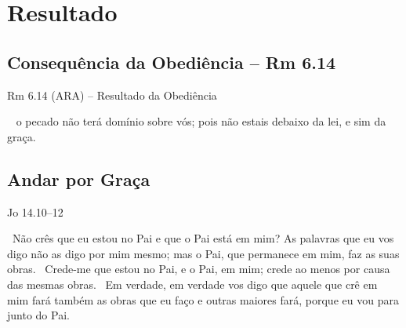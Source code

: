 \documentclass[12pt,aspectratio=169]{beamer}
\newcommand{\ver}[1]{%
    \raisebox{0.50ex}{%
        \scalebox{1.1}{%
            \pmb{\textbf{\textcolor{BSpbg}{#1}}}%
        }%
    }%
}
\newcommand{\QUOTE}[1]{%
    \par\noindent\hspace*{0.05\linewidth}%
    \begin{minipage}{0.9\linewidth}%
        \linespread{1.35}\large{#1}%
    \end{minipage}%
}
\newcommand{\RED}[1]{{\textcolor{TXred}{#1}}}
\newcommand{\ORA}[1]{{\textcolor{TXred!50!TXyel}{#1}}}
\newcommand{\YEL}[1]{{\textcolor{TXyel}{#1}}}
\newcommand{\GRE}[1]{{\textcolor{TXgre}{#1}}}
\newcommand{\CYA}[1]{{\textcolor{TXcya}{#1}}}
\newcommand{\BRI}[1]{{\textcolor{BSpbg}{#1}}}   %
\begin{document}
\section{Resultado}

    \subsection{Consequência da Obediência -- Rm 6.14}

    \begin{frame}{Rm 6.14 (ARA) -- Resultado da \YEL{Obediência}}
        \QUOTE{%
            \ver{14}~\alt<2->{\ORA{Então}}{Porque} \YEL{o pecado não terá domínio sobre vós};
            pois não estais \RED{debaixo da lei}, \GRE{e sim da graça}.
        }
    \end{frame}

    \subsection{Andar por Graça}

    \begin{frame}{Jo 14.10--12}
        \QUOTE{%
            \ver{10}~Não crês que eu \BRI{estou no Pai e que o Pai está em mim}? As palavras que
            eu vos digo \YEL{não as digo por mim mesmo}; mas \GRE{o Pai}, que permanece em mim,
            \GRE{faz as suas obras}.
            \ver{11}~Crede-me que \BRI{estou no Pai, e o Pai, em mim}; crede ao menos \CYA{por
            causa das mesmas obras}.
            \ver{12}~Em verdade, em verdade vos digo que \YEL{aquele que crê em mim} \CYA{fará
            também as obras que eu faço e outras maiores fará}, porque eu vou para junto do Pai.
        }
    \end{frame}
\end{document}
